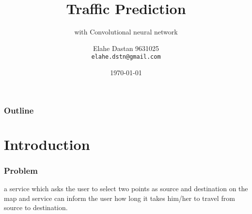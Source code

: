 \documentclass{beamer}
\author[Elahe Dastan]{%
  Elahe Dastan\hfill
  9631025\\
  \texttt{elahe.dstn@gmail.com}
}
\title{Traffic Prediction}
\subtitle{with Convolutional neural network}
\institute[AUT]{Machine Learning\\Amirkabir University of Technology}
\date{\minimaldate\today}
\begin{document}
\begin{frame}
  \titlepage{}
\end{frame}
\begin{frame}
  \frametitle{Outline}
  \tableofcontents{}
\end{frame}

\section{Introduction}

\begin{frame}
  \frametitle{Problem}
  \par
  a service which asks the user to select two points as source and destination on the map and
  service can inform the user how long it takes him/her to travel from source to destination.
\end{frame}
\end{document}
